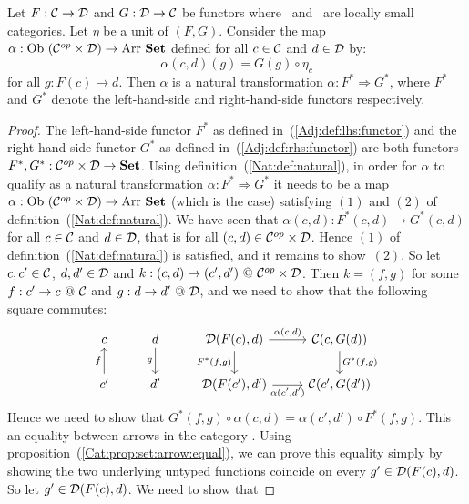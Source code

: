 \begin{prop}\label{Adj:prop:natural:left:right}
    Let $F:\mbox{$\cal C$}\to\mbox{$\cal D$}$ and $G:\mbox{$\cal D$}\to\mbox{$\cal C$}$ be functors where \Cat\ and \Dat\ 
    are locally small categories. Let $\eta$ be a unit of $(F,G)$. Consider the
    map $\alpha:\ob\ (\Cop\times\Dat)\to\arr\ \Set$ defined for all $c\in\mbox{$\cal C$}$ and
    $d\in\mbox{$\cal D$}$ by:
        \[
            \alpha(c,d)(g)=G(g)\circ\eta_{c}
        \]
    for all $g:F(c)\to d$. Then $\alpha$ is a natural transformation 
    $\alpha:F^{*}\Rightarrow G^{*}$, where $F^{*}$ and $G^{*}$ denote
    the left-hand-side and right-hand-side functors respectively.
\end{prop}
\begin{proof}
    The left-hand-side functor $F^{*}$ as defined in~(\ref{Adj:def:lhs:functor})
    and the right-hand-side functor $G^{*}$ as defined 
    in~(\ref{Adj:def:rhs:functor}) are both functors 
    $F^{*},G^{*}:\mbox{${\cal C}^{op}$}\times\mbox{$\cal D$}\to\mbox{\bf Set}$. Using definition~(\ref{Nat:def:natural}),
    in order for $\alpha$ to qualify as a natural transformation 
    $\alpha:F^{*}\Rightarrow G^{*}$ it needs to be a map
    $\alpha:\ob\ (\Cop\times\Dat)\to\arr\ \Set$ (which is the case) satisfying
    $(1)$ and $(2)$ of definition~(\ref{Nat:def:natural}). We have
    seen that $\alpha(c,d):F^{*}(c,d)\to G^{*}(c,d)$ for all $c\in\mbox{$\cal C$}$
    and $d\in\mbox{$\cal D$}$, that is for all $(c,d)\in\mbox{${\cal C}^{op}$}\times\mbox{$\cal D$}$. Hence $(1)$ of
    definition~(\ref{Nat:def:natural}) is satisfied, and it remains to show~$(2)$.
    So let $c,c'\in\mbox{$\cal C$}$, $d,d'\in\mbox{$\cal D$}$ and $k:(c,d)\to(c',d')\ @\ \mbox{${\cal C}^{op}$}\times\mbox{$\cal D$}$.
    Then $k=(f,g)$ for some $f:c'\to c\ @\ \mbox{$\cal C$}$ and $g:d \to d'\ @\ \mbox{$\cal D$}$, and
    we need to show that the following square commutes:
    \[
        \begin{tikzcd}
            c
            &d\arrow[d,swap, "g"]
            &\Dat(F(c),d)\arrow[r, "\alpha\mbox{$(c,d)$}"]
             \arrow[d, swap,"F^{*}\mbox{$(f,g)$}"]
            &\Cat(c,G(d))
             \arrow[d, "G^{*}\mbox{$(f,g)$}"]
            \\
            c'\arrow[u, "f"]
            &d'
            &\Dat(F(c'),d')\arrow[r, swap, "\alpha\mbox{$(c',d')$}"]
            &\Cat(c',G(d'))
        \end{tikzcd}
    \]
    Hence we need to show that $G^{*}(f,g)\circ\alpha(c,d)=\alpha(c',d')\circ
    F^{*}(f,g)$. This an equality between arrows in the category \Set. Using
    proposition~(\ref{Cat:prop:set:arrow:equal}), we can prove this equality
    simply by showing the two underlying untyped functions coincide on 
    every $g'\in\mbox{$\cal D$}(F(c),d)$. So let $g'\in\mbox{$\cal D$}(F(c),d)$. We need to show that

\end{proof}
